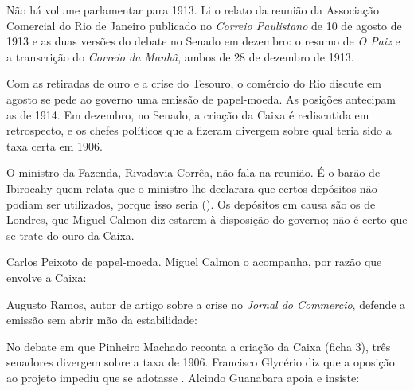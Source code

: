 

Não há volume parlamentar para 1913. Li o relato da reunião da Associação
Comercial do Rio de Janeiro publicado no \textit{Correio Paulistano} de 10 de
agosto de 1913 e as duas versões do debate no Senado em dezembro: o resumo de
\textit{O Paiz} e a transcrição do \textit{Correio da Manhã}, ambos de 28 de
dezembro de 1913.


Com as retiradas de ouro e a crise do Tesouro, o comércio do Rio discute em
agosto se pede ao governo uma emissão de papel-moeda. As posições antecipam as
de 1914. Em dezembro, no Senado, a criação da Caixa é rediscutida em
retrospecto, e os chefes políticos que a fizeram divergem sobre qual teria sido
a taxa certa em 1906.


O ministro da Fazenda, Rivadavia Corrêa, não fala na reunião. É o barão de
Ibirocahy quem relata que o ministro lhe declarara que certos depósitos não
podiam ser utilizados, porque isso seria  (). Os
depósitos em causa são os de Londres, que Miguel Calmon diz estarem à
disposição do governo; não é certo que se trate do ouro da Caixa.

Carlos Peixoto  de
papel-moeda. Miguel Calmon o acompanha, por razão que envolve a Caixa:


Augusto Ramos, autor de artigo sobre a crise no \textit{Jornal do Commercio},
defende a emissão sem abrir mão da estabilidade:



No debate em que Pinheiro Machado reconta a criação da Caixa (ficha 3), três
senadores divergem sobre a taxa de 1906. Francisco Glycério diz que a oposição
ao projeto impediu que se adotasse . Alcindo Guanabara apoia e insiste:

